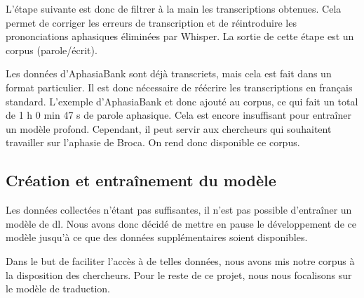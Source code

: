 L'étape suivante est donc de filtrer à la main les transcriptions obtenues.
Cela permet de corriger les erreurs de transcription 
et de réintroduire les prononciations aphasiques éliminées par Whisper.
La sortie de cette étape est un corpus (parole/écrit).

Les données d'AphasiaBank sont déjà transcriets, mais cela est fait dans un format particulier.
Il est donc nécessaire de réécrire les transcriptions en français standard.
L'exemple d'AphasiaBank et donc ajouté au corpus, ce qui fait un total de 1 h 0 min 47 s de parole aphasique.
Cela est encore insuffisant pour entraîner un modèle profond.
Cependant, il peut servir aux chercheurs qui souhaitent travailler sur l'aphasie de Broca.
On rend donc disponible ce corpus.

\subsection{Création et entraînement du modèle}

Les données collectées n'étant pas suffisantes,
il n'est pas possible d'entraîner un modèle de \gls{dl}.
Nous avons donc décidé de mettre en pause le développement de ce modèle 
jusqu'à ce que des données supplémentaires soient disponibles.

Dans le but de faciliter l'accès à de telles données,
nous avons mis notre corpus à la disposition des chercheurs.
Pour le reste de ce projet,
nous nous focalisons sur le modèle de traduction.